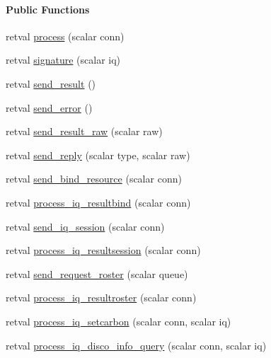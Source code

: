 \begin{Indent}\paragraph*{\-Public \-Functions}
\begin{DoxyCompactItemize}
\item 
retval \hyperlink{class_d_jabberd_1_1_i_q_ab7f1ec7c252b6da66a3a6e2e64655647}{process} (scalar conn)
\item 
retval \hyperlink{class_d_jabberd_1_1_i_q_adf4865df72289b614ac44f31e2869f0e}{signature} (scalar iq)
\item 
retval \hyperlink{class_d_jabberd_1_1_i_q_a3de529d0070a411c54d79055179d8ef9}{send\-\_\-result} ()
\item 
retval \hyperlink{class_d_jabberd_1_1_i_q_a9e9e1f3138367930156ba2c50e6386e8}{send\-\_\-error} ()
\item 
retval \hyperlink{class_d_jabberd_1_1_i_q_a888e61f6e3c8c0a3c878b942fd62902f}{send\-\_\-result\-\_\-raw} (scalar raw)
\item 
retval \hyperlink{class_d_jabberd_1_1_i_q_a7922459ee40a46bfa8a0922cdce6520f}{send\-\_\-reply} (scalar type, scalar raw)
\item 
retval \hyperlink{class_d_jabberd_1_1_i_q_a3afd1c4ff090d0b9d267b1dd5ad981ef}{send\-\_\-bind\-\_\-resource} (scalar conn)
\item 
retval \hyperlink{class_d_jabberd_1_1_i_q_a47e5a19f5c50c9e7e4a40d026d1f2897}{process\-\_\-iq\-\_\-resultbind} (scalar conn)
\item 
retval \hyperlink{class_d_jabberd_1_1_i_q_a43241b6670fe3e6115de375472f6364a}{send\-\_\-iq\-\_\-session} (scalar conn)
\item 
retval \hyperlink{class_d_jabberd_1_1_i_q_aceb72acec2f528fc52685f0e24ac73dd}{process\-\_\-iq\-\_\-resultsession} (scalar conn)
\item 
retval \hyperlink{class_d_jabberd_1_1_i_q_a2490ef3e24a43653a2ad25219b62445b}{send\-\_\-request\-\_\-roster} (scalar queue)
\item 
retval \hyperlink{class_d_jabberd_1_1_i_q_ab0999cc64c6098c6c3aac785c31382d5}{process\-\_\-iq\-\_\-resultroster} (scalar conn)
\item 
retval \hyperlink{class_d_jabberd_1_1_i_q_a84196c74d47b62331f3cd48f7f39542d}{process\-\_\-iq\-\_\-setcarbon} (scalar conn, scalar iq)
\item 
retval \hyperlink{class_d_jabberd_1_1_i_q_a97041ceee8e11af4faff228f576b0a8f}{process\-\_\-iq\-\_\-disco\-\_\-info\-\_\-query} (scalar conn, scalar iq)

\end{DoxyCompactItemize}
\end{Indent}
